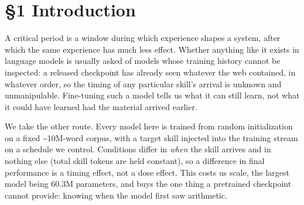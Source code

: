 \documentclass[11pt]{article}
\begin{document}
\begin{abstract}
The two results are timing effects at different levels: \emph{which} skills a late start
damages is skill-specific, while the damage itself is carried by the optimizer's
schedule rather than by representations that have hardened against revision.

\end{abstract}
\section{§1 Introduction}\label{introduction}

A critical period is a window during which experience shapes a system, after which the same
experience has much less effect. Whether anything like it exists in language models is
usually asked of models whose training history cannot be inspected: a released checkpoint
has already seen whatever the web contained, in whatever order, so the timing of any
particular skill's arrival is unknown and unmanipulable. Fine-tuning such a model tells us
what it can still learn, not what it could have learned had the material arrived earlier.

We take the other route. Every model here is trained from random initialization on a fixed
\textasciitilde10M-word corpus, with a target skill injected into the training stream on a schedule we
control. Conditions differ in \emph{when} the skill arrives and in nothing else (total skill
tokens are held constant), so a difference in final performance is a timing effect, not a
dose effect. This costs us scale, the largest model being 60.3M parameters, and buys the one
thing a pretrained checkpoint cannot provide: knowing when the model first saw arithmetic.
\end{document}
